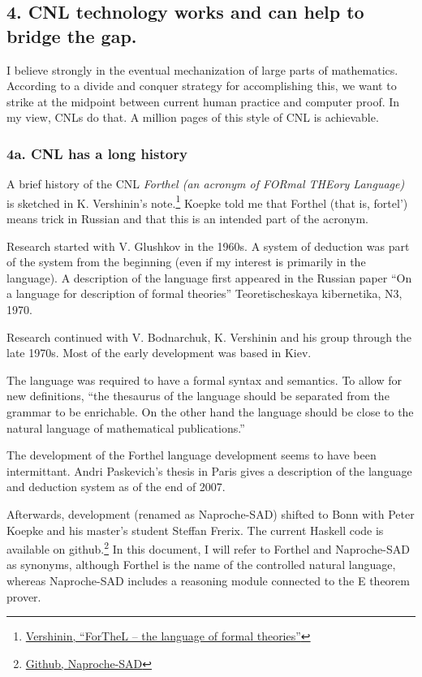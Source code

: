 \documentclass[12pt]{amsart}
\renewcommand{\~}{\ }
\renewcommand{\_}{\textunderscore}
\begin{document}
\subsection*{4.  CNL technology works and can help to bridge the gap.}

I believe strongly in the eventual mechanization of large parts of
mathematics.  According to a divide and conquer strategy for
accomplishing this, we want to strike at the midpoint between current
human practice and computer proof.  In my view, CNLs do that.  A
million pages of this style of CNL is achievable.

\subsubsection*{4a. CNL has a long history}

A brief history of the CNL {\it Forthel (an acronym of FORmal THEory
  Language)} is sketched in K. Vershinin's note.\footnote{%
  \href{http://tertium.org/papers/ita-00.ps.gz}{Vershinin, ``ForTheL
    -- the language of formal theories''}} Koepke told me that Forthel
(that is, fortel') means trick in Russian and that this is an intended
part of the acronym.

Research started with V. Glushkov in the 1960s.  A system of deduction
was part of the system from the beginning (even if my interest is
primarily in the language).  A description of the language first
appeared in the Russian paper ``On a language for description of
formal theories'' Teoretischeskaya kibernetika, N3, 1970.

Research continued with V. Bodnarchuk, K. Vershinin and his group
through the late 1970s.  Most of the early development was based in
Kiev.

The language was required to have a formal syntax and semantics.  To
allow for new definitions, ``the thesaurus of the language should be
separated from the grammar to be enrichable.  On the other hand the
language should be close to the natural language of mathematical
publications.''

The development of the Forthel language development seems to have been
intermittant.  Andri Paskevich's thesis in Paris gives a description
of the language and deduction system as of the end of 2007.

Afterwards, development (renamed as Naproche-SAD) shifted to Bonn with
Peter Koepke and his master's student Steffan Frerix.  The current
Haskell code is available on
github.\footnote{\href{https://github.com/Naproche/Naproche-SAD}{Github,
    Naproche-SAD}} In this document, I will refer to Forthel and
Naproche-SAD as synonyms, although Forthel is the name of the
controlled natural language, whereas Naproche-SAD includes a reasoning
module connected to the E theorem prover.
\end{document}
